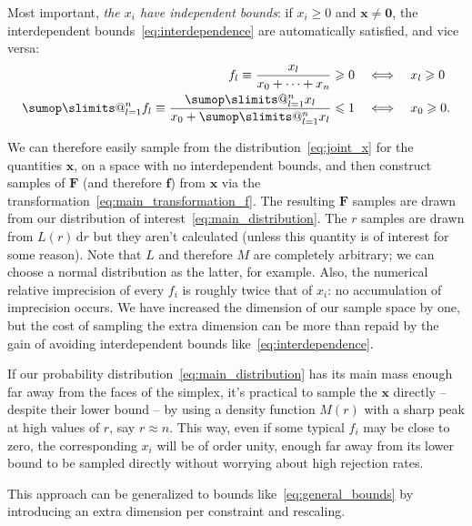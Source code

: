 \documentclass[\ifafour a4paper,12pt,\else a5paper,10pt,\fi%
onecolumn,oneside,article,%
british%
]{memoir}
\makeatletter
\theoremstyle{remark}
\theoremstyle{innote}
\def\sum{\DOTSI\sumop\slimits@}
\newcommand*{\di}{\mathrm{d}}%
\renewcommand*{\le}{\leqslant}%
\renewcommand*{\ge}{\geqslant}%
\renewcommand*{\|}[1][]{\nonscript\,#1\vert\nonscript\;\mathopen{}}
\newcommand*{\yff}{f}
\newcommand*{\yf}{\bm{\yff}}
\newcommand*{\yfi}{\bm{F}}
\newcommand*{\yh}{L}
\newcommand*{\yhb}{M}
\newcommand*{\yyy}{x}
\newcommand*{\yy}{\bm{\yyy}}
\makeatother
\begin{document}
\smallskip

Most important, \emph{the $\yyy_{i}$ have independent bounds}: if
$\yyy_{i} \ge 0$ and $\yy \ne \bm{0}$, the interdependent
bounds~\eqref{eq:interdependence} are automatically satisfied, and vice
versa:
\begin{equation}
  \label{eq:translation_bounds}
  \begin{aligned}
    \yff_{l} \equiv \frac{\yyy_{l}}{\yyy_{0} + \dotsb + \yyy_{n}}\ge 0
    \quad&\Longleftrightarrow\quad \yyy_{l} \ge 0
    \\
    \sum_{l=1}^{n} \yff_{l} \equiv
    \frac{\sum_{l=1}^{n} \yyy_{l}}{\yyy_{0} + \sum_{l=1}^{n} \yyy_{l}} \le 1
    \quad&\Longleftrightarrow\quad
    \yyy_{0} \ge 0.
  \end{aligned}
\end{equation}



We can therefore easily sample from the distribution~\eqref{eq:joint_x} for
the quantities $\yy$, on a space with no interdependent bounds, and then
construct samples of $\yfi$ (and therefore $\yf$) from $\yy$ via the
transformation~\eqref{eq:main_transformation_f}. The resulting $\yfi$
samples are drawn from our distribution of
interest~\eqref{eq:main_distribution}. The $r$ samples are drawn from
$\yh(r)\,\di r$ but they aren't calculated (unless this quantity is of
interest for some reason). Note that $\yh$ and therefore $\yhb$ are
completely arbitrary; we can choose a normal distribution as the latter,
for example. Also, the numerical relative imprecision of every $\yff_{i}$
is roughly twice that of $\yyy_{i}$: no accumulation of imprecision occurs.
We have increased the dimension of our sample space by one, but the cost of
sampling the extra dimension can be more than repaid by the gain of avoiding
interdependent bounds like~\eqref{eq:interdependence}.

If our probability distribution~\eqref{eq:main_distribution} has its main
mass enough far away from the faces of the simplex, it's practical to
sample the $\yy$ directly -- despite their lower bound -- by using a
density function $\yhb(r)$ with a sharp peak at high values of $r$, say
$r\approx n$. This way, even if some typical $\yff_{i}$ may be close to
zero, the corresponding $\yyy_{i}$ will be of order unity, enough far away
from its lower bound to be sampled directly without worrying about high
rejection rates.

This approach can be generalized to bounds like~\eqref{eq:general_bounds}
by introducing an extra dimension per constraint and rescaling.
\end{document}
